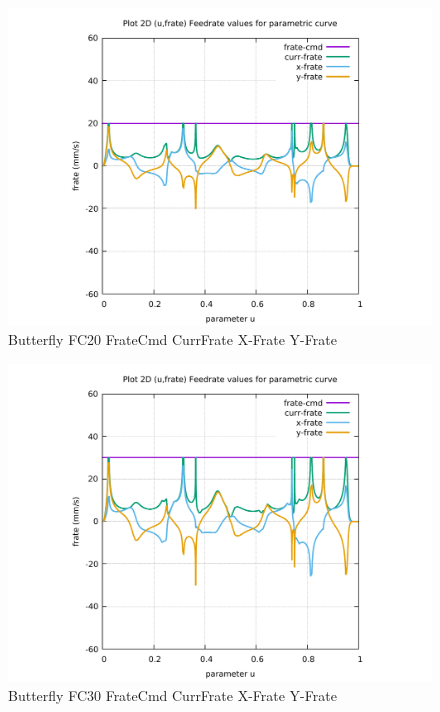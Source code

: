 \begin{figure}
	\caption     {Butterfly FC20 FrateCmd CurrFrate X-Frate Y-Frate}
	\label{28-img-Butterfly-FC20-FrateCmd-CurrFrate-X-Frate-Y-Frate.pdf}
\includegraphics[width=1.00\textwidth]{Chap4/appendix/app-Butterfly/plots/28-img-Butterfly-FC20-FrateCmd-CurrFrate-X-Frate-Y-Frate.pdf}
\end{figure}


\clearpage
\pagebreak

\begin{figure}
	\caption     {Butterfly FC30 FrateCmd CurrFrate X-Frate Y-Frate}
	\label{29-img-Butterfly-FC30-FrateCmd-CurrFrate-X-Frate-Y-Frate.pdf}
\includegraphics[width=1.00\textwidth]{Chap4/appendix/app-Butterfly/plots/29-img-Butterfly-FC30-FrateCmd-CurrFrate-X-Frate-Y-Frate.pdf}
\end{figure}


